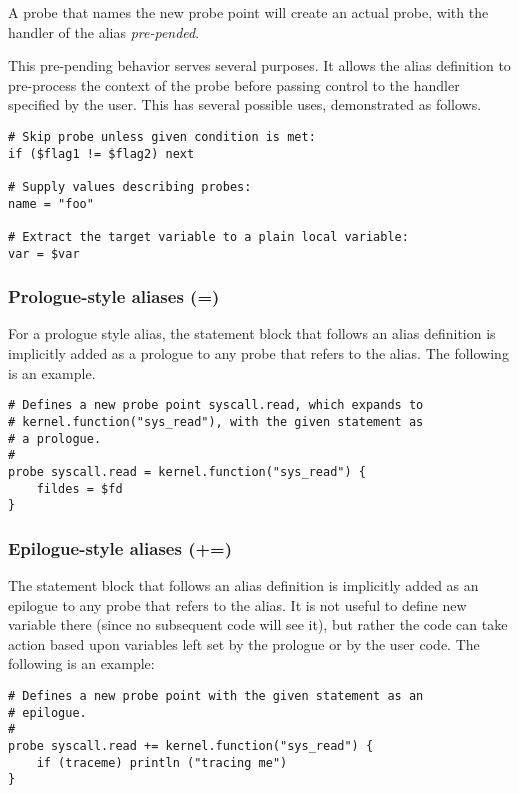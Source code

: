 \documentclass[twoside,english]{article}
\newenvironment{vindent}
{\begin{list}{}{\setlength{\listparindent}{6pt}}
\item[]}
{\end{list}}
\begin{document}
A probe that names the new probe point will create an actual probe, with
the handler of the alias \emph{pre-pended}.

This pre-pending behavior serves several purposes. It allows the alias definition
to pre-process the context of the probe before passing control to the handler
specified by the user. This has several possible uses, demonstrated as follows.

\begin{vindent}
\begin{verbatim}
# Skip probe unless given condition is met:
if ($flag1 != $flag2) next

# Supply values describing probes:
name = "foo"

# Extract the target variable to a plain local variable:
var = $var
\end{verbatim}
\end{vindent}

\subsubsection{Prologue-style aliases (=)}
\index{=}
For a prologue style alias, the statement block that follows an alias definition
is implicitly added as a prologue to any probe that refers to the alias.
The following is an example.

\begin{vindent}
\begin{verbatim}
# Defines a new probe point syscall.read, which expands to
# kernel.function("sys_read"), with the given statement as
# a prologue.
#
probe syscall.read = kernel.function("sys_read") {
    fildes = $fd
}
\end{verbatim}
\end{vindent}

\subsubsection{Epilogue-style aliases (+=)}
\index{+=}
The statement block that follows an alias definition is implicitly added
as an epilogue to any probe that refers to the alias.  It is not useful
to define new variable there (since no subsequent code will see it), but
rather the code can take action based upon variables left set by the
prologue or by the user code.  The following is an example:

\begin{vindent}
\begin{verbatim}
# Defines a new probe point with the given statement as an
# epilogue.
#
probe syscall.read += kernel.function("sys_read") {
    if (traceme) println ("tracing me")
}
\end{verbatim}
\end{vindent}
\end{document}
